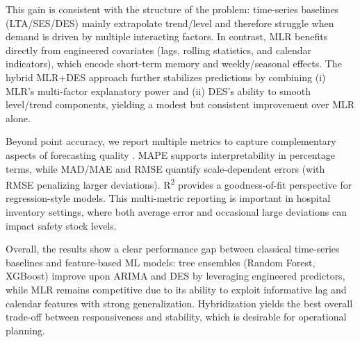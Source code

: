 \documentclass[conference]{IEEEtran}
\begin{document}
This gain is consistent with the structure of the problem: time-series baselines (LTA/SES/DES) mainly extrapolate trend/level and therefore struggle when demand is driven by multiple interacting factors. In contrast, MLR benefits directly from engineered covariates (lags, rolling statistics, and calendar indicators), which encode short-term memory and weekly/seasonal effects. The hybrid MLR+DES approach further stabilizes predictions by combining (i) MLR's multi-factor explanatory power and (ii) DES's ability to smooth level/trend components, yielding a modest but consistent improvement over MLR alone.

Beyond point accuracy, we report multiple metrics to capture complementary aspects of forecasting quality \cite{b11}. MAPE supports interpretability in percentage terms, while MAD/MAE and RMSE quantify scale-dependent errors (with RMSE penalizing larger deviations). R\textsuperscript{2} provides a goodness-of-fit perspective for regression-style models. This multi-metric reporting is important in hospital inventory settings, where both average error and occasional large deviations can impact safety stock levels.

Overall, the results show a clear performance gap between classical time-series baselines and feature-based ML models: tree ensembles (Random Forest, XGBoost) improve upon ARIMA and DES by leveraging engineered predictors, while MLR remains competitive due to its ability to exploit informative lag and calendar features with strong generalization. Hybridization yields the best overall trade-off between responsiveness and stability, which is desirable for operational planning.
\end{document}

